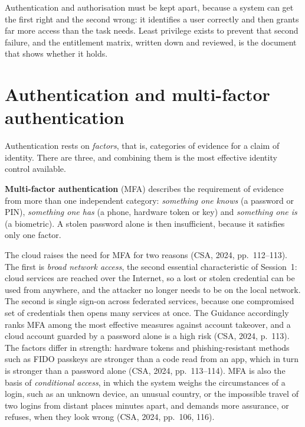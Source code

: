 Authentication and authorisation must be kept apart, because a system can
get the first right and the second wrong: it identifies a user correctly and
then grants far more access than the task needs. Least privilege exists to
prevent that second failure, and the entitlement matrix, written down and
reviewed, is the document that shows whether it holds.

\section{Authentication and multi-factor authentication}

Authentication rests on \emph{factors}, that is, categories of evidence for
a claim of identity. There are three, and combining them is the most
effective identity control available.

\begin{definition}\label{def:mfa}
\textbf{Multi-factor authentication} (MFA) describes the requirement of
evidence from more than one independent category: \emph{something one knows}
(a password or PIN), \emph{something one has} (a phone, hardware token or
key) and \emph{something one is} (a biometric). A stolen password alone is
then insufficient, because it satisfies only one factor.
\end{definition}

The cloud raises the need for MFA for two reasons (CSA, 2024, pp.~112--113).
The first is \emph{broad network access}, the second essential
characteristic of Session~1: cloud services are reached over the Internet,
so a lost or stolen credential can be used from anywhere, and the attacker
no longer needs to be on the local network. The second is single sign-on
across federated services, because one compromised set of credentials then
opens many services at once. The Guidance accordingly ranks MFA among the
most effective measures against account takeover, and a cloud account
guarded by a password alone is a high risk (CSA, 2024, p.~113). The factors
differ in strength: hardware tokens and phishing-resistant methods such as
FIDO passkeys are stronger than a code read from an app, which in turn is
stronger than a password alone (CSA, 2024, pp.~113--114). MFA is also the
basis of \emph{conditional access}, in which the system weighs the
circumstances of a login, such as an unknown device, an unusual country, or
the impossible travel of two logins from distant places minutes apart, and
demands more assurance, or refuses, when they look wrong (CSA, 2024,
pp.~106, 116).

